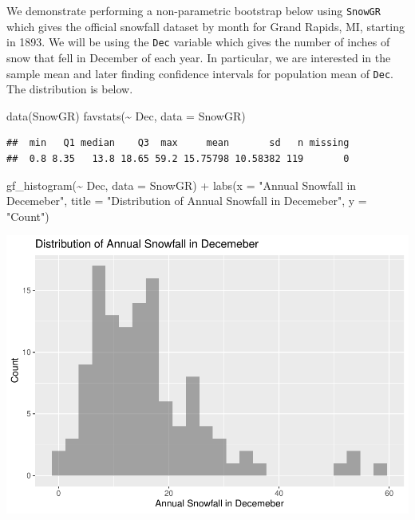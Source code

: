 \documentclass[12pt]{article}
\newenvironment{Shaded}{\begin{snugshade}}{\end{snugshade}}
\newcommand{\AttributeTok}[1]{\textcolor[rgb]{0.77,0.63,0.00}{#1}}
\newcommand{\FunctionTok}[1]{\textcolor[rgb]{0.00,0.00,0.00}{#1}}
\newcommand{\NormalTok}[1]{#1}
\newcommand{\SpecialCharTok}[1]{\textcolor[rgb]{0.00,0.00,0.00}{#1}}
\newcommand{\StringTok}[1]{\textcolor[rgb]{0.31,0.60,0.02}{#1}}
\begin{document}
We demonstrate performing a non-parametric bootstrap below using
\texttt{SnowGR} which gives the official snowfall dataset by month for
Grand Rapids, MI, starting in 1893. We will be using the \texttt{Dec}
variable which gives the number of inches of snow that fell in December
of each year. In particular, we are interested in the sample mean and
later finding confidence intervals for population mean of \texttt{Dec}.
The distribution is below.

\begin{Shaded}
\begin{Highlighting}[]
\FunctionTok{data}\NormalTok{(SnowGR)}
\FunctionTok{favstats}\NormalTok{(}\SpecialCharTok{\textasciitilde{}}\NormalTok{ Dec, }\AttributeTok{data =}\NormalTok{ SnowGR)}
\end{Highlighting}
\end{Shaded}

\begin{verbatim}
##  min   Q1 median    Q3  max     mean       sd   n missing
##  0.8 8.35   13.8 18.65 59.2 15.75798 10.58382 119       0
\end{verbatim}

\begin{Shaded}
\begin{Highlighting}[]
\FunctionTok{gf\_histogram}\NormalTok{(}\SpecialCharTok{\textasciitilde{}}\NormalTok{ Dec, }\AttributeTok{data =}\NormalTok{ SnowGR) }\SpecialCharTok{+}
  \FunctionTok{labs}\NormalTok{(}\AttributeTok{x =} \StringTok{"Annual Snowfall in Decemeber"}\NormalTok{, }\AttributeTok{title =} \StringTok{"Distribution of Annual Snowfall in Decemeber"}\NormalTok{, }\AttributeTok{y =} \StringTok{"Count"}\NormalTok{)}
\end{Highlighting}
\end{Shaded}

\includegraphics{paper_files/figure-latex/unnamed-chunk-1-1.pdf}
\end{document}
